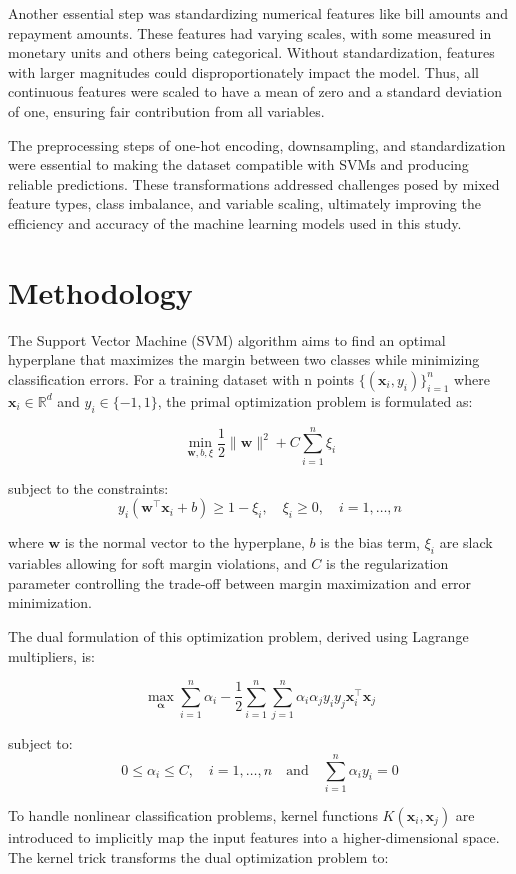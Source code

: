 \documentclass{article}
\begin{document}
Another essential step was standardizing numerical features like bill amounts and repayment amounts. These features had varying scales, with some measured in monetary units and others being categorical. 
Without standardization, features with larger magnitudes could disproportionately impact the model. Thus, all continuous features were scaled to have a mean of zero and a standard deviation of one, 
ensuring fair contribution from all variables.

The preprocessing steps of one-hot encoding, downsampling, and standardization were essential to making the dataset compatible with SVMs and producing reliable predictions. 
These transformations addressed challenges posed by mixed feature types, class imbalance, and variable scaling, ultimately improving the efficiency and accuracy of the machine learning models used in this study.


\section{Methodology}
The Support Vector Machine (SVM) algorithm aims to find an optimal hyperplane that maximizes the margin between two classes while minimizing classification errors. For a training dataset with n points $\{(\mathbf{x}_i, y_i)\}_{i=1}^n$ where $\mathbf{x}_i \in \mathbb{R}^d$ and $y_i \in \{-1, 1\}$, the primal optimization problem is formulated as:

\[
\min_{\mathbf{w}, b, \xi} \frac{1}{2} \|\mathbf{w}\|^2 + C \sum_{i=1}^n \xi_i
\]

subject to the constraints:
\[
y_i(\mathbf{w}^\top\mathbf{x}_i + b) \geq 1 - \xi_i, \quad \xi_i \geq 0, \quad i = 1,\ldots,n
\]

where $\mathbf{w}$ is the normal vector to the hyperplane, $b$ is the bias term, $\xi_i$ are slack variables allowing for soft margin violations, and $C$ is the regularization parameter controlling the trade-off between margin maximization and error minimization.

The dual formulation of this optimization problem, derived using Lagrange multipliers, is:

\[
\max_{\boldsymbol{\alpha}} \sum_{i=1}^n \alpha_i - \frac{1}{2}\sum_{i=1}^n\sum_{j=1}^n \alpha_i\alpha_j y_i y_j \mathbf{x}_i^\top\mathbf{x}_j
\]

subject to:
\[
0 \leq \alpha_i \leq C, \quad i = 1,\ldots,n \quad \text{and} \quad \sum_{i=1}^n \alpha_i y_i = 0
\]

To handle nonlinear classification problems, kernel functions $K(\mathbf{x}_i, \mathbf{x}_j)$ are introduced to implicitly map the input features into a higher-dimensional space. The kernel trick transforms the dual optimization problem to:
\end{document}
